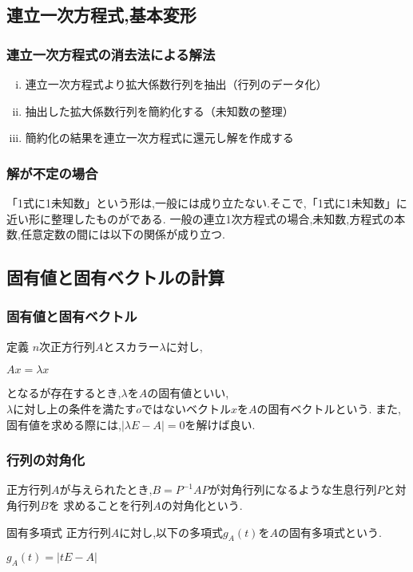 \documentclass[a4paper]{jsarticle}
\begin{document}
\subsection{連立一次方程式,基本変形}
\subsubsection{連立一次方程式の消去法による解法}
\begin{enumerate}[(i)]
    \item 連立一次方程式より拡大係数行列を抽出（行列のデータ化）
    \item 抽出した拡大係数行列を簡約化する（未知数の整理）
    \item 簡約化の結果を連立一次方程式に還元し解を作成する
\end{enumerate}
\subsubsection{解が不定の場合}
「1式に1未知数」という形は,一般には成り立たない.そこで,「1式に1未知数」に近い形に整理したものがである.
一般の連立1次方程式の場合,未知数,方程式の本数,任意定数の間には以下の関係が成り立つ.
\begin{center}
\end{center}
\subsection{固有値と固有ベクトルの計算}
\subsubsection{固有値と固有ベクトル}
\begin{itembox}[l]{定義}
    $n$次正方行列$A$とスカラー$\lambda$に対し,
    \begin{center}
        $Ax=\lambda x$
    \end{center}
    となるが存在するとき,$\lambda$を$A$の固有値といい,\\
    $\lambda$に対し上の条件を満たす$o$ではないベクトル$x$を$A$の固有ベクトルという.
    また,固有値を求める際には,$|\lambda E-A|=0$を解けば良い.
\end{itembox}
\subsubsection{行列の対角化}
正方行列$A$が与えられたとき,$B=P^{-1}AP$が対角行列になるような生息行列$P$と対角行列$B$を
求めることを行列$A$の対角化という.
\begin{itembox}[l]{固有多項式}
    正方行列$A$に対し,以下の多項式$g_A\left(t\right)$を$A$の固有多項式という.
    \begin{center}
        $g_A\left(t\right) = \left|tE-A\right| $
    \end{center}
\end{itembox}
\end{document}
